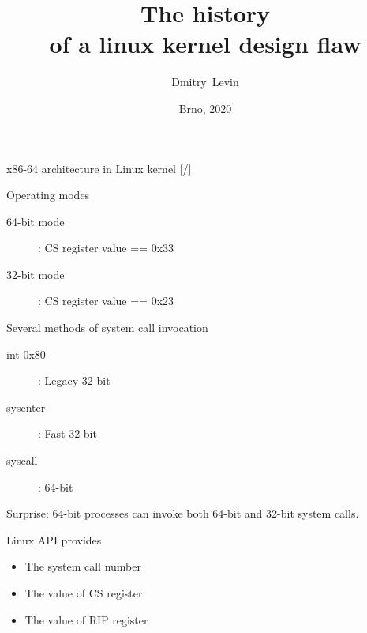\documentclass[unicode,aspectratio=169,xcolor={table,dvipsnames,usernames}]{beamer}
\title{\Huge The history \\ of a linux kernel design flaw}
\author{\Huge Dmitry~Levin}
\date{\Large Brno, 2020}
\begin{document}
\begin{frame}[noframenumbering]
\titlepage
\end{frame}

\begin{frame}{x86-64 architecture in Linux kernel \hfill [\insertframenumber/\inserttotalframenumber]}
\large
\begin{block}{Operating modes}
\begin{description}
	\item[64-bit mode]: CS register value == 0x33
	\item[32-bit mode]: CS register value == 0x23
\end{description}
\end{block}

\begin{block}{Several methods of system call invocation}
\begin{description}
	\item[int 0x80]: Legacy 32-bit
	\item[sysenter]: Fast 32-bit
	\item[syscall]: 64-bit
\end{description}
\end{block}

Surprise: 64-bit processes can invoke both 64-bit and 32-bit system calls.

\begin{block}{Linux API provides}
\begin{itemize}
	\item The system call number
	\item The value of CS register
	\item The value of RIP register
\end{itemize}
\end{block}
\end{frame}
\end{document}
